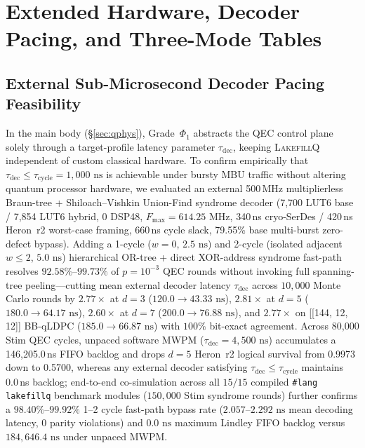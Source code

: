\documentclass[acmsmall,screen,anonymous]{acmart}
\DeclareRobustCommand{\_}{\ifmmode\text{\char95}\else\char95\penalty0\relax\fi}
\theoremstyle{plain}
\newcommand{\LakefillQ}{\textsc{LakefillQ}}
\begin{document}
\section{Extended Hardware, Decoder Pacing, and Three-Mode Tables}
\label{app:hardware}

\subsection{External Sub-Microsecond Decoder Pacing Feasibility}
\label{sec:fpga}

In the main body (\S\ref{sec:qphys}), Grade~$\Phi_1$ abstracts the QEC control plane solely through a target-profile latency parameter $\tau_{\mathrm{dec}}$, keeping \LakefillQ{} independent of custom classical hardware. To confirm empirically that $\tau_{\mathrm{dec}} \le \tau_{\mathrm{cycle}} = 1{,}000\text{ ns}$ is achievable under bursty MBU traffic without altering quantum processor hardware, we evaluated an external 500\,MHz multiplierless Braun-tree + Shiloach--Vishkin Union-Find syndrome decoder (7,700 LUT6 base / 7,854 LUT6 hybrid, 0 DSP48, $F_{\max} = 614.25\text{ MHz}$, 340\,ns cryo-SerDes / 420\,ns Heron~r2 worst-case framing, 660\,ns cycle slack, 79.55\% base multi-burst zero-defect bypass). Adding a 1-cycle ($w = 0$, $2.5\text{ ns}$) and 2-cycle (isolated adjacent $w \le 2$, $5.0\text{ ns}$) hierarchical OR-tree + direct XOR-address syndrome fast-path resolves $92.58\%$--$99.73\%$ of $p = 10^{-3}$ QEC rounds without invoking full spanning-tree peeling---cutting mean external decoder latency $\tau_{\mathrm{dec}}$ across $10{,}000$ Monte Carlo rounds by $2.77\times$ at $d=3$ ($120.0 \to 43.33\text{ ns}$), $2.81\times$ at $d=5$ ($180.0 \to 64.17\text{ ns}$), $2.60\times$ at $d=7$ ($200.0 \to 76.88\text{ ns}$), and $2.77\times$ on [[144, 12, 12]] BB-qLDPC ($185.0 \to 66.87\text{ ns}$) with $100\%$ bit-exact agreement. Across 80,000 Stim QEC cycles, unpaced software MWPM ($\tau_{\mathrm{dec}} = 4{,}500\text{ ns}$) accumulates a 146,205.0\,ns FIFO backlog and drops $d=5$ Heron~r2 logical survival from 0.9973 down to 0.5700, whereas any external decoder satisfying $\tau_{\mathrm{dec}} \le \tau_{\mathrm{cycle}}$ maintains 0.0\,ns backlog; end-to-end co-simulation across all $15/15$ compiled \texttt{\#lang lakefillq} benchmark modules ($150{,}000$ Stim syndrome rounds) further confirms a $98.40\%$--$99.92\%$ 1--2 cycle fast-path bypass rate ($2.057$--$2.292\text{ ns}$ mean decoding latency, $0$ parity violations) and $0.0\text{ ns}$ maximum Lindley FIFO backlog versus $184{,}646.4\text{ ns}$ under unpaced MWPM.
\end{document}
